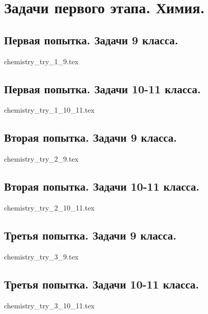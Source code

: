 \chapter{Задачи первого этапа. Химия.}

\section{Первая попытка. Задачи 9 класса.}

{chemistry_try_1_9.tex}

\section{Первая попытка. Задачи 10-11 класса.}

{chemistry_try_1_10_11.tex}

\section{Вторая попытка. Задачи 9 класса.}

{chemistry_try_2_9.tex}

\section{Вторая попытка. Задачи 10-11 класса.}

{chemistry_try_2_10_11.tex}

\section{Третья попытка. Задачи 9 класса.}

{chemistry_try_3_9.tex}

\section{Третья попытка. Задачи 10-11 класса.}

{chemistry_try_3_10_11.tex}

